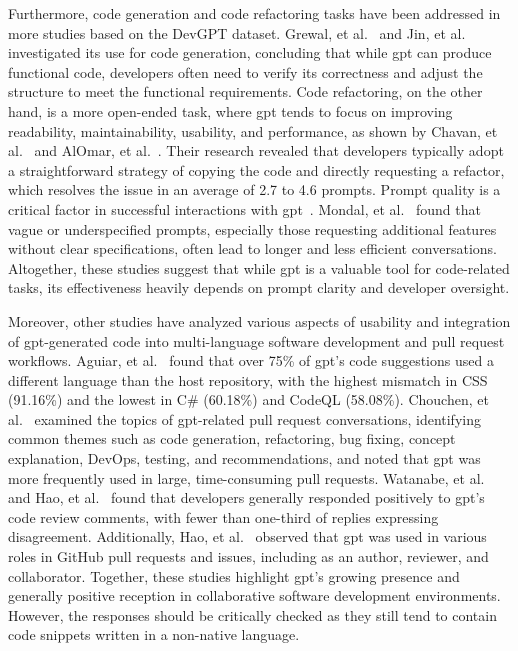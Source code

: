 Furthermore, code generation and code refactoring tasks have been addressed in more studies based on the DevGPT dataset. Grewal, et al.~\cite{Grewal2024-codegen} and Jin, et al.~\cite{Jin2024-codegen} investigated its use for code generation, concluding that while \acrshort{gpt} can produce functional code, developers often need to verify its correctness and adjust the structure to meet the functional requirements. Code refactoring, on the other hand, is a more open-ended task, where \acrshort{gpt} tends to focus on improving readability, maintainability, usability, and performance, as shown by Chavan, et al.~\cite{Chavan2024-refactoring} and AlOmar, et al.~\cite{AlOmar2024-refactoring}. Their research revealed that developers typically adopt a straightforward strategy of copying the code and directly requesting a refactor, which resolves the issue in an average of 2.7 to 4.6 prompts. Prompt quality is a critical factor in successful interactions with \acrshort{gpt}~\cite{Mondal2024-prompts-issues, Wu2024-promptpatterns}. Mondal, et al.~\cite{Mondal2024-prompts-issues} found that vague or underspecified prompts, especially those requesting additional features without clear specifications, often lead to longer and less efficient conversations. Altogether, these studies suggest that while \acrshort{gpt} is a valuable tool for code-related tasks, its effectiveness heavily depends on prompt clarity and developer oversight.

Moreover, other studies have analyzed various aspects of usability and integration of \acrshort{gpt}-generated code into multi-language software development and pull request workflows. Aguiar, et al.~\cite{aguiar-multilang-chatgpt} found that over 75\% of \acrshort{gpt}'s code suggestions used a different language than the host repository, with the highest mismatch in CSS (91.16\%) and the lowest in C\# (60.18\%) and CodeQL (58.08\%). Chouchen, et al.~\cite{chouchen2024-pr-how} examined the topics of \acrshort{gpt}-related pull request conversations, identifying common themes such as code generation, refactoring, bug fixing, concept explanation, DevOps, testing, and recommendations, and noted that \acrshort{gpt} was more frequently used in large, time-consuming pull requests. Watanabe, et al.~\cite{watanabe-code-review-chatgpt} and Hao, et al.~\cite{Hao2024-pr-exporatory} found that developers generally responded positively to \acrshort{gpt}'s code review comments, with fewer than one-third of replies expressing disagreement. Additionally, Hao, et al.~\cite{Hao2024-pr-empirical} observed that \acrshort{gpt} was used in various roles in GitHub pull requests and issues, including as an author, reviewer, and collaborator. Together, these studies highlight \acrshort{gpt}'s growing presence and generally positive reception in collaborative software development environments. However, the responses should be critically checked as they still tend to contain code snippets written in a non-native language. 

